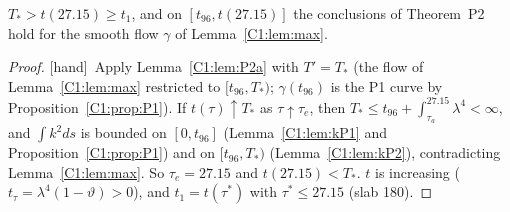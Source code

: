\documentclass[11pt]{article}
\newcommand{\tH}{\textup{[hand]}}\newcommand{\tS}{\textup{[sym]}}\newcommand{\tC}{\textup{[cert]}}\newcommand{\tI}{\textup{[cited]}}\newcommand{\tN}{\textup{[num]}}
\begin{document}
\begin{proposition}[identification on P2]\label{C1:prop:P2}
$T_*>t(27.15)\ge t_1$, and on $[t_{96},t(27.15)]$ the conclusions of Theorem~P2 hold for the smooth flow $\gamma$ of Lemma~\ref{C1:lem:max}.
\end{proposition}
\begin{proof}\tH\ Apply Lemma~\ref{C1:lem:P2a} with $T'=T_*$ (the flow of Lemma~\ref{C1:lem:max} restricted to $[t_{96},T_*)$; $\gamma(t_{96})$ is the P1 curve by Proposition~\ref{C1:prop:P1}). If $t(\tau)\uparrow T_*$ as $\tau\uparrow\tau_e$, then $T_*\le t_{96}+\int_{\tau_a}^{27.15}\lambda^4<\infty$, and $\int k^2ds$ is bounded on $[0,t_{96}]$ (Lemma~\ref{C1:lem:kP1} and Proposition~\ref{C1:prop:P1}) and on $[t_{96},T_*)$ (Lemma~\ref{C1:lem:kP2}), contradicting Lemma~\ref{C1:lem:max}. So $\tau_e=27.15$ and $t(27.15)<T_*$. $t$ is increasing ($t_\tau=\lambda^4(1-\vartheta)>0$), and $t_1=t(\tau^*)$ with $\tau^*\le27.15$ (slab 180).
\end{proof}

\end{document}
